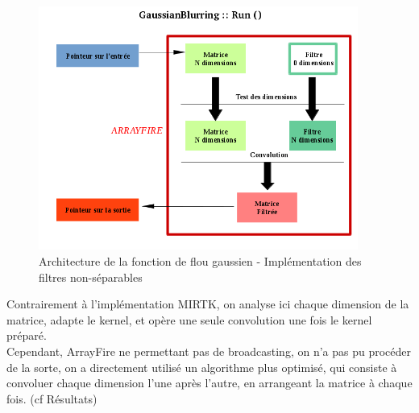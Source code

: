\documentclass{report}
\begin{document}
\begin{figure}[h!]
	\begin{center}
		\includegraphics[height=8cm]{figures/gaussianblurring.png}
		\caption{Architecture de la fonction de flou gaussien - Implémentation des filtres non-séparables}
		\label{Architecture de la fonction de flou gaussien - Implémentation des filtres non-séparables}
	\end{center}
\end{figure}

Contrairement à l'implémentation MIRTK, on analyse ici chaque dimension de la matrice, adapte le kernel, et opère une seule convolution une fois le kernel préparé.\\
Cependant, ArrayFire ne permettant pas de broadcasting, on n'a pas pu procéder de la sorte, on a directement utilisé un algorithme plus optimisé, qui consiste à convoluer chaque dimension l'une après l'autre, en arrangeant la matrice à chaque fois. (cf Résultats)
\end{document}
